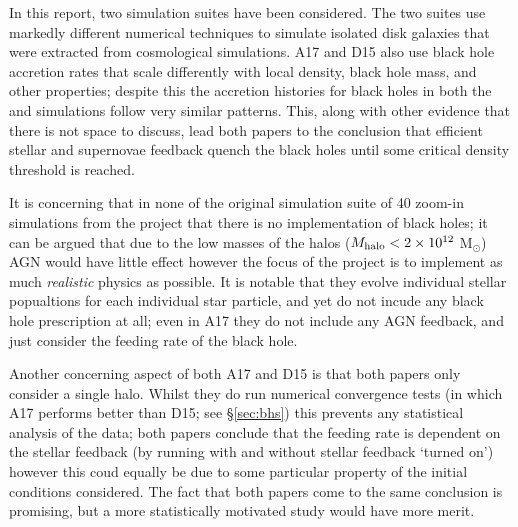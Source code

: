 In this report, two simulation suites have been considered. The two suites use
markedly different numerical techniques to simulate isolated disk galaxies
that were extracted from cosmological simulations. A17 and D15 also use
black hole accretion rates that scale differently with local density, black
hole mass, and other properties; despite this the accretion histories for
black holes in both the \fire{} and \hagn{} simulations follow very similar
patterns. This, along with other evidence that there is not space to discuss,
lead both papers to the conclusion that efficient stellar and supernovae
feedback quench the black holes until some critical density threshold is
reached.

It is concerning that in none of the original simulation suite of 40 zoom-in
simulations from the \fire{} project that there is no implementation of black
holes; it can be argued that due to the low masses of the halos
($M_{\rm halo} < 2 \times 10^{12}$ M$_\odot$) AGN would have little effect
\citep[see e.g.][and citations]{bower_breaking_2006} however the focus of
the \fire{} project is to implement as much \emph{realistic} physics as
possible. It is notable that they evolve individual stellar popualtions for
each individual star particle, and yet do not incude any black hole
prescription at all; even in A17 they do not include any AGN feedback, and just
consider the feeding rate of the black hole.

Another concerning aspect of both A17 and D15 is that both papers only consider
a single halo. Whilst they do run numerical convergence tests (in which A17
performs better than D15; see §\ref{sec:bhs}) this prevents any statistical
analysis of the data; both papers conclude that the feeding rate is dependent
on the stellar feedback (by running with and without stellar feedback `turned
on') however this coud equally be due to some particular property of the
initial conditions considered. The fact that both papers come to the same
conclusion is promising, but a more statistically motivated study would have
more merit.
